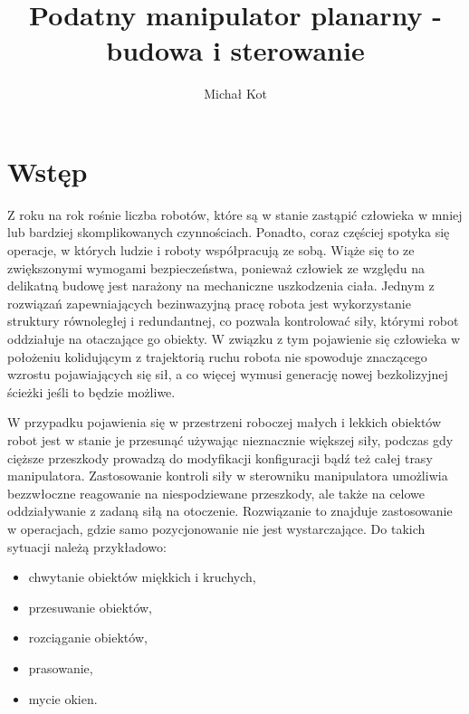 \documentclass[printmode]{mgr}
\title{Podatny manipulator planarny - budowa i sterowanie}
\author{Michał Kot}
\begin{document}

\maketitle %
\tableofcontents %


\chapter{Wstęp}
Z roku na rok rośnie liczba robotów, które są w stanie zastąpić człowieka w mniej lub bardziej skomplikowanych czynnościach. Ponadto,
coraz częściej spotyka się operacje, w których ludzie i roboty współpracują ze sobą. Wiąże się to ze zwiększonymi wymogami bezpieczeństwa, 
ponieważ człowiek ze względu na delikatną budowę jest narażony na mechaniczne uszkodzenia ciała. Jednym z rozwiązań
zapewniających bezinwazyjną pracę robota jest wykorzystanie struktury równoległej i redundantnej, co pozwala kontrolować siły, którymi
robot oddziałuje na otaczające go obiekty. W związku z tym pojawienie się człowieka w położeniu kolidującym z trajektorią ruchu
robota nie spowoduje znaczącego wzrostu pojawiających się sił, a co więcej wymusi generację nowej bezkolizyjnej ścieżki jeśli to będzie możliwe.

W przypadku pojawienia się w przestrzeni roboczej małych i lekkich obiektów robot
jest w stanie je przesunąć używając nieznacznie większej siły, podczas gdy cięższe przeszkody prowadzą do modyfikacji
konfiguracji bądź też całej trasy manipulatora. Zastosowanie kontroli siły w sterowniku manipulatora umożliwia bezzwłoczne reagowanie
na niespodziewane przeszkody, ale także na celowe oddziaływanie z zadaną siłą na otoczenie. Rozwiązanie to znajduje zastosowanie
w operacjach, gdzie samo pozycjonowanie nie jest wystarczające. Do takich sytuacji należą przykładowo:
\begin{itemize}
\item chwytanie obiektów miękkich i kruchych,
\item przesuwanie obiektów,
\item rozciąganie obiektów,
\item prasowanie,
\item mycie okien.
\end{itemize}
\end{document}

